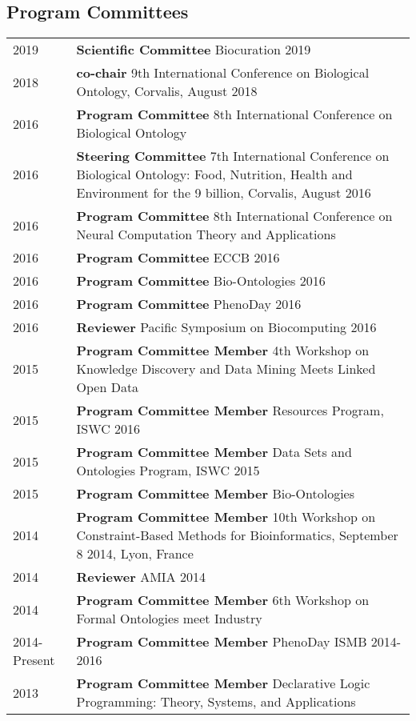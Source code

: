 \documentclass[11pt,fullpage]{article}
\begin{document}
\subsection*{Program Committees}

\begin{longtable}{p{0.5in}|p{5.5in}}

  2019  & \textbf{Scientific Committee} Biocuration 2019 \\
  2018  & \textbf{co-chair}  9th International Conference on Biological Ontology, Corvalis, August 2018 \\
  2016  & \textbf{Program Committee}  8th International Conference on Biological Ontology \\
  2016  & \textbf{Steering Committee}  7th International Conference on Biological Ontology: Food, Nutrition, Health and Environment for the 9 billion, Corvalis, August 2016 \\
  2016  & \textbf{Program Committee}  8th International Conference on Neural Computation Theory and Applications \\
  2016  & \textbf{Program Committee}  ECCB 2016 \\
  2016  & \textbf{Program Committee}  Bio-Ontologies 2016 \\
  2016  & \textbf{Program Committee}  PhenoDay 2016 \\
  2016  & \textbf{Reviewer}  Pacific Symposium on Biocomputing 2016 \\
  2015  & \textbf{Program Committee Member}  4th Workshop on Knowledge Discovery and Data Mining Meets Linked Open Data \\
  2015  & \textbf{Program Committee Member}  Resources Program, ISWC 2016 \\
  2015  & \textbf{Program Committee Member}  Data Sets and Ontologies Program, ISWC 2015 \\
  2015  & \textbf{Program Committee Member} Bio-Ontologies \\
  2014  & \textbf{Program Committee Member} 10th Workshop on Constraint-Based Methods for Bioinformatics, September 8 2014, Lyon, France \\
  2014  & \textbf{Reviewer} AMIA 2014 \\
  2014 & \textbf{Program Committee Member} 6th Workshop on Formal Ontologies meet Industry\\
  2014-Present & \textbf{Program Committee Member} PhenoDay ISMB 2014-2016\\
  2013  & \textbf{Program Committee Member} Declarative Logic Programming: Theory, Systems, and Applications \\

\end{longtable}
\end{document}
